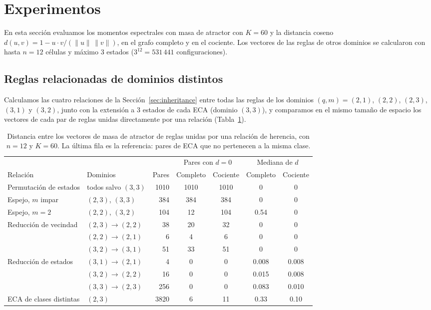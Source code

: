 \section{Experimentos}
\label{sec:experiments}

En esta sección evaluamos los momentos espectrales con masa de atractor con $K = 60$ y la distancia coseno $d(u, v) = 1 - u \cdot v / (\|u\|\,\|v\|)$, en el grafo completo y en el cociente. Los vectores de las reglas de otros dominios se calcularon con hasta $n = 12$ células y máximo 3 estados ($3^{12} = 531\,441$ configuraciones).

\subsection{Reglas relacionadas de dominios distintos}
\label{subsec:cross-domain}

Calculamos las cuatro relaciones de la Sección~\ref{sec:inheritance} entre todas las reglas de los dominios $(q, m) = (2,1)$, $(2,2)$, $(2,3)$, $(3,1)$ y $(3,2)$, junto con la extensión a 3 estados de cada ECA (dominio $(3,3)$), y comparamos en el mismo tamaño de espacio los vectores de cada par de reglas unidas directamente por una relación (Tabla~\ref{tab:cross-domain}).

\begin{table}[!htbp]
\centering
\setlength{\tabcolsep}{2.5pt}
\begin{tabular}{llrcccc}
\hline
 & & & \multicolumn{2}{c}{Pares con $d = 0$} & \multicolumn{2}{c}{Mediana de $d$} \\
Relación & Dominios & Pares & Completo & Cociente & Completo & Cociente \\
\hline
Permutación de estados & todos salvo $(3,3)$ & 1010 & 1010 & 1010 & 0 & 0 \\
Espejo, $m$ impar & $(2,3)$, $(3,3)$ & 384 & 384 & 384 & 0 & 0 \\
Espejo, $m = 2$ & $(2,2)$, $(3,2)$ & 104 & 12 & 104 & 0.54 & 0 \\
Reducción de vecindad & $(2,3) \to (2,2)$ & 38 & 20 & 32 & 0 & 0 \\
 & $(2,2) \to (2,1)$ & 6 & 4 & 6 & 0 & 0 \\
 & $(3,2) \to (3,1)$ & 51 & 33 & 51 & 0 & 0 \\
Reducción de estados & $(3,1) \to (2,1)$ & 4 & 0 & 0 & 0.008 & 0.008 \\
 & $(3,2) \to (2,2)$ & 16 & 0 & 0 & 0.015 & 0.008 \\
 & $(3,3) \to (2,3)$ & 256 & 0 & 0 & 0.083 & 0.010 \\
\hline
ECA de clases distintas & $(2,3)$ & 3820 & 6 & 11 & 0.33 & 0.10 \\
\hline
\end{tabular}
\caption{Distancia entre los vectores de masa de atractor de reglas unidas por una relación de herencia, con $n = 12$ y $K = 60$. La última fila es la referencia: pares de ECA que no pertenecen a la misma clase.}
\label{tab:cross-domain}
\end{table}

